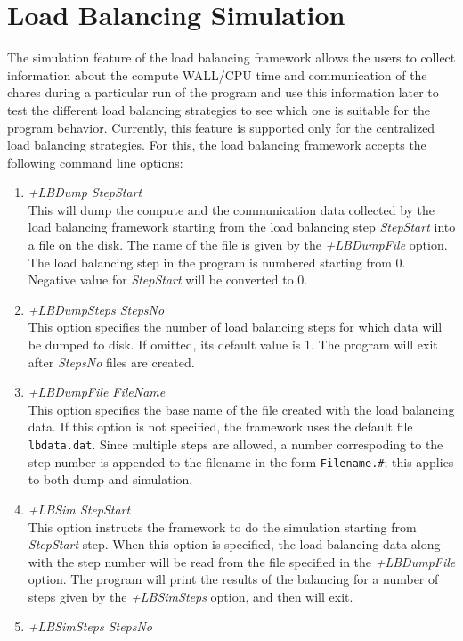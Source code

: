 \section{Load Balancing Simulation}

The simulation feature of the load balancing framework allows the users to collect information
about the compute WALL/CPU time and communication of the chares during a particular run of
the program and use this information later to test the different load balancing strategies to
see which one is suitable for the program behavior. Currently, this feature is supported only for
the centralized load balancing strategies. For this, the load balancing framework
accepts the following command line options:
\begin{enumerate}
\item {\em +LBDump StepStart}\\
        This will dump the compute and the communication data collected by the load balancing framework
	starting from the load balancing step {\em StepStart} into a file on the disk. The name of the file
	is given by the {\em +LBDumpFile} option. The load balancing step in the
  program is numbered starting from 0. Negative value for {\em StepStart} will be converted to 0.
\item {\em +LBDumpSteps StepsNo}\\
        This option specifies the number of load balancing steps for which data will be dumped to disk.
        If omitted, its default value is 1. The program will exit after {\em StepsNo} files are created.
\item {\em +LBDumpFile FileName}\\
        This option specifies the base name of the file created with the load balancing data. If this
	option is not specified, the framework uses the default file {\tt lbdata.dat}. Since multiple steps are allowed,
	a number correspoding to the step number is appended to the filename in the form {\tt Filename.\#};
  this applies to both dump and simulation.
\item {\em +LBSim StepStart}\\
	This option instructs the framework to do the simulation starting from {\em StepStart} step.
	When this option is specified, the load balancing data along with the step
  number will be read from the file specified in the {\em +LBDumpFile}
	option. The program will print the results of the balancing for a number of steps given
  by the {\em +LBSimSteps} option, and then will exit.
\item {\em +LBSimSteps StepsNo}\\

\end{enumerate}
